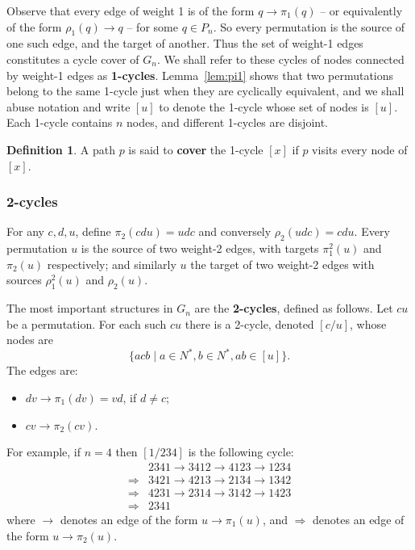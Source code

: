 \documentclass[a4paper]{article}
\theoremstyle{definition}
\newtheorem{defn}{Definition}[section]
\theoremstyle{remark}
\let\definiendum\textbf
\begin{document}
Observe that every edge of weight 1 is of the form $q\to\pi_1(q)$ -- or equivalently of the form $\rho_1(q)\to q$ -- for some $q\in P_n$. So every permutation is the source of one such edge, and the target of another. Thus the set of weight-1 edges constitutes a cycle cover of $G_n$. We shall refer to these cycles of nodes connected by weight-1 edges as \definiendum{1-cycles}. Lemma~\ref{lem:pi1} shows that two permutations belong to the same 1-cycle just when they are cyclically equivalent, and we shall abuse notation and write $[u]$ to denote the 1-cycle whose set of nodes is $[u]$. Each 1-cycle contains $n$ nodes, and different 1-cycles are disjoint.

\begin{defn}\label{def:covers}
    A path $p$ is said to \definiendum{cover} the 1-cycle $[x]$ if $p$ visits every node of $[x]$.
\end{defn}

\subsubsection{2-cycles}
For any $c, d, u$, define $\pi_2(cdu) = udc$ and conversely $\rho_2(udc)=cdu$.
Every permutation $u$ is the source of two weight-2 edges, with targets $\pi_1^2(u)$ and $\pi_2(u)$ respectively; and similarly $u$ the target of two weight-2 edges with sources $\rho_1^2(u)$ and $\rho_2(u)$.

The most important structures in $G_n$ are the \definiendum{2-cycles}, defined as follows. Let $cu$ be a permutation. For each such $cu$ there is a 2-cycle, denoted $[c/u]$, whose nodes are
\[
    \{ acb \;|\; a\in N^*, b\in N^*, ab \in [u] \}.
\]
The edges are:
\begin{itemize}
    \item $dv\to\pi_1(dv) = vd$, if $d\ne c$;
    \item $cv\to\pi_2(cv)$.
\end{itemize}

\let\To\Rightarrow
For example, if $n=4$ then $[1/234]$ is the following cycle:
\begin{align*}
    &2341 \to 3412 \to 4123 \to 1234\\
    \To{} &3421 \to 4213 \to 2134 \to 1342\\
    \To{} &4231 \to 2314 \to 3142 \to 1423\\
    \To{} &2341
\end{align*}
where $\to$ denotes an edge of the form $u\to\pi_1(u)$, and $\To$ denotes an edge of the form $u\to\pi_2(u)$.
\end{document}

